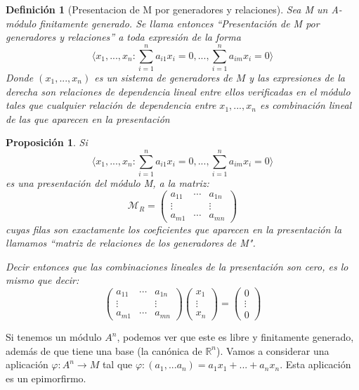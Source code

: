 \documentclass[11pt, a4paper, titlepage]{article}
\theoremstyle{theorem-style}
\newtheorem*{nprop}{Proposición}
\theoremstyle{definition-style}
\newtheorem*{ndef}{Definición}
\theoremstyle{remark-style}
\theoremstyle{example-style}
\begin{document}
\begin{ndef}[Presentacion de M por generadores y relaciones]
	Sea M un A-módulo finitamente generado. Se llama entonces “Presentación de M por generadores y relaciones” a toda expresión de la forma
	\[
	\langle x_1,...,x_n : \sum_{i=1}^n a_{i1}x_i = 0,...,\sum_{i=1}^n a_{im}x_i = 0 \rangle
	\]
	Donde $(x_1,...,x_n)$ es un sistema de generadores de $M$ y las expresiones de la derecha son relaciones de dependencia lineal entre ellos verificadas en el módulo tales que cualquier relación de dependencia entre $x_1,...,x_n$ es combinación lineal de las que aparecen en la presentación
	
\end{ndef}

\begin{nprop}
		Si 
	\[
	\langle x_1,...,x_n : \sum_{i=1}^n a_{i1}x_i = 0,...,\sum_{i=1}^n a_{im}x_i = 0 \rangle
	\]
	es una presentación del módulo M, a la matriz:
	\[
	\mathcal{M}_R = \begin{pmatrix}
 a_{11} & \cdots & a_{1n}\\
 \vdots & & \vdots\\
 a_{m1} & \cdots & a_{mn} 
\end{pmatrix} 
	\]
	cuyas filas son exactamente los coeficientes que aparecen en la presentación la llamamos “matriz de relaciones de los generadores de M".
	
	Decir entonces que las combinaciones lineales de la presentación son cero, es lo mismo que decir:
	\[
	\begin{pmatrix}
 a_{11} & \cdots & a_{1n}\\
 \vdots & & \vdots\\
 a_{m1} & \cdots & a_{mn} 
\end{pmatrix} \begin{pmatrix}
 x_1  \\
 \vdots\\
 x_n 
\end{pmatrix} =  \begin{pmatrix}
 0  \\
 \vdots\\
 0
\end{pmatrix} 
	\]
\end{nprop}

	
	Si tenemos un módulo $A^n$, podemos ver que este es libre y finitamente generado, además de que tiene una base (la canónica de $\mathbb{R}^n$). Vamos a considerar una aplicación $\varphi: A^n \to M$ tal que $\varphi:(a_1,...a_n) = a_1x_1+...+a_nx_n$. Esta aplicación es un epimorfirmo.
\end{document}
